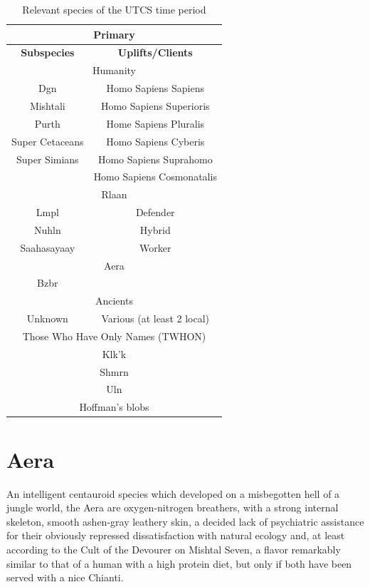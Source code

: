 \begin{table}[h]
\begin{center}
\begin{tabular}{|c|c|}
\hline
\multicolumn{2}{|c|}{\bf Primary}\\
\hline
{\bf Subspecies} & {\bf Uplifts/Clients }\\
\hline
\hline
\multicolumn{2}{|c|}{Humanity}\\
\hline
Dgn & Homo Sapiens Sapiens\\
Mishtali & Homo Sapiens Superioris\\
Purth & Home Sapiens Pluralis\\
Super Cetaceans & Homo Sapiens Cyberis\\
Super Simians & Homo Sapiens Suprahomo\\
& Homo Sapiens Cosmonatalis\\
\hline
\hline
\multicolumn{2}{|c|}{Rlaan}\\
\hline
Lmpl & Defender\\
Nuhln & Hybrid\\
Saahasayaay & Worker\\
\hline
\hline
\multicolumn{2}{|c|}{Aera}\\
\hline
Bzbr & \\
\hline
\hline
\multicolumn{2}{|c|}{Ancients}\\
\hline
Unknown & Various (at least 2 local) \\
\hline
\hline
\multicolumn{2}{|c|}{Those Who Have Only Names (TWHON)}\\
\hline
\hline
\multicolumn{2}{|c|}{Klk'k}\\
\hline
\hline
\multicolumn{2}{|c|}{Shmrn} \\ 
\hline
\hline
\multicolumn{2}{|c|}{Uln} \\
\hline
\hline
\multicolumn{2}{|c|}{Hoffman's blobs}\\
\hline
\end{tabular}
\caption{Relevant species of the UTCS time period}
\label{table:relevantspecies}
\end{center}
\end{table}

\section{Aera}

An intelligent centauroid species which developed on a misbegotten
hell of a jungle world, the Aera are oxygen-nitrogen breathers, with a
strong internal skeleton, smooth ashen-gray leathery skin, a decided
lack of psychiatric assistance for their obviously repressed
dissatisfaction with natural ecology and, at least according to the
Cult of the Devourer on Mishtal Seven, a flavor remarkably similar to
that of a human with a high protein diet, but only if both have been
served with a nice Chianti.


